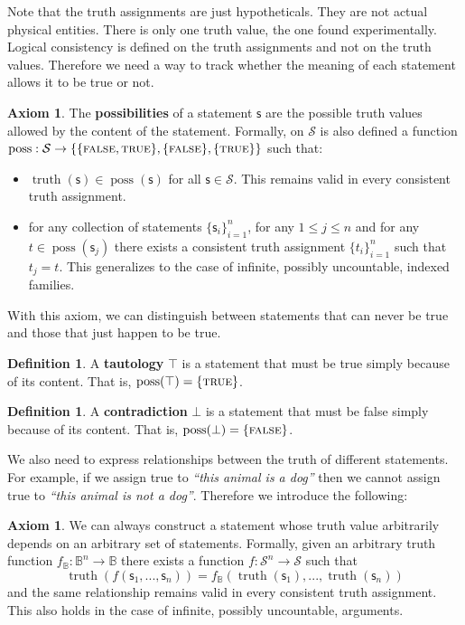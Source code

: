 \documentclass[letterpaper]{article}
\theoremstyle{plain}%
\theoremstyle{definition}
\newtheorem{defn}[thrm]{Definition}
\newtheorem{axiom}[thrm]{Axiom}
\theoremstyle{remark}
\numberwithin{equation}{section}
\DeclareMathOperator{\truth}{truth}
\DeclareMathOperator{\possFn}{poss}
\def\TRUE{\textsc{true}}
\def\FALSE{\textsc{false}}
\def\tautology{\top}
\def\contradiction{\bot}
\newcommand{\stmt}[1][s] {\mathsf{#1}}
\newcommand{\statement}[1] {\emph{``#1''}}
\begin{document}
Note that the truth assignments are just hypotheticals. They are not actual physical entities. There is only one truth value, the one found experimentally. Logical consistency is defined on the truth assignments and not on the truth values. Therefore we need a way to track whether the meaning of each statement allows it to be true or not.

\begin{axiom}\label{ax_possibilities}
	The \textbf{possibilities} of a statement $\stmt$ are the possible truth values allowed by the content of the statement. Formally, on $\mathcal{S}$ is also defined a function $\possFn: \mathcal{S} \to \{\{\FALSE, \TRUE\},\{\FALSE\},\{\TRUE\}\}$ such that:
	\begin{itemize}
		\item $\truth(\stmt) \in \possFn(\stmt)$ for all $\stmt \in \mathcal{S}$. This remains valid in every consistent truth assignment.
		\item for any collection of statements $\{\stmt_i\}^n_{i=1}$, for any $1 \leq j \leq n$ and for any $t \in \possFn(\stmt_j)$ there exists a consistent truth assignment $\{t_i\}^n_{i=1}$ such that $t_j = t$. This generalizes to the case of infinite, possibly uncountable, indexed families.
	\end{itemize}
\end{axiom}

With this axiom, we can distinguish between statements that can never be true and those that just happen to be true.

\begin{defn}
	A \textbf{tautology} $\tautology$ is a statement that must be true simply because of its content. That is, $\possFn(\tautology) = \{\TRUE\}$.
\end{defn}

\begin{defn}
	A \textbf{contradiction} $\contradiction$ is a statement that must be false simply because of its content. That is, $\possFn(\contradiction) = \{\FALSE\}$.
\end{defn}

We also need to express relationships between the truth of different statements. For example, if we assign true to \statement{this animal is a dog} then we cannot assign true to \statement{this animal is not a dog}. Therefore we introduce the following:


\begin{axiom}\label{ax_functions_of_statement}
	We can always construct a statement whose truth value arbitrarily depends on an arbitrary set of statements. Formally, given an arbitrary truth function $f_{\mathbb{B}} : \mathbb{B}^n \to \mathbb{B}$ there exists a function $f : \mathcal{S}^n \to \mathcal{S}$ such that
	$$\truth(f(\stmt_1, ..., \stmt_n)) = f_{\mathbb{B}}(\truth(\stmt_1), ..., \truth(\stmt_n))$$
	and the same relationship remains valid in every consistent truth assignment. This also holds in the case of infinite, possibly uncountable, arguments.
\end{axiom}
\end{document}
